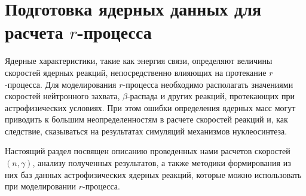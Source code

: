 \section{Подготовка ядерных данных для расчета $r$-процесса} 
\label{sec:reaclib}
Ядерные характеристики, такие как энергия связи, определяют величины скоростей ядерных реакций, непосредственно влияющих на протекание $r$-процесса. Для моделирования $r$-процесса необходимо располагать значениями скоростей нейтронного захвата, $\beta$-распада и других реакций, протекающих при астрофизических условиях. При этом ошибки определения ядерных масс могут приводить к большим неопределенностям в расчете скоростей реакций и, как следствие, сказываться на результатах симуляций механизмов нуклеосинтеза.

Настоящий раздел посвящен описанию проведенных нами расчетов скоростей $(n,\gamma)$, анализу полученных результатов, а также методики формирования из них баз данных астрофизических ядерных реакций, которые можно использовать при моделировании $r$-процесса.




